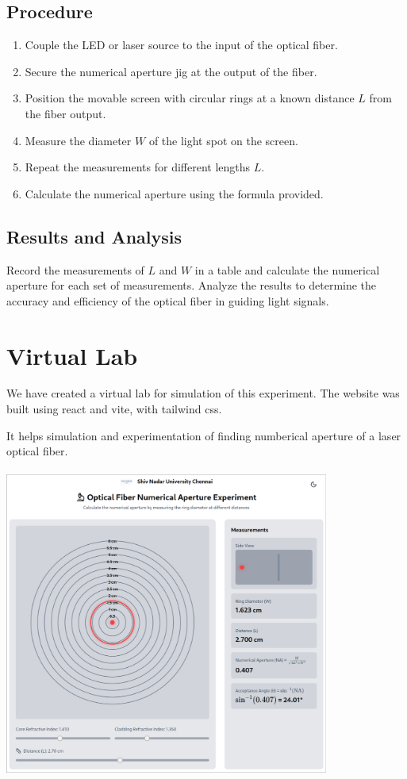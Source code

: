 \documentclass{article}
\theoremstyle{mytheoremstyle}
\theoremstyle{mytheoremstyle}
\theoremstyle{myproblemstyle}
\begin{document}
\subsection{Procedure}

\begin{enumerate}
    \item Couple the LED or laser source to the input of the optical fiber.
    \item Secure the numerical aperture jig at the output of the fiber.
    \item Position the movable screen with circular rings at a known distance \(L\) from the fiber output.
    \item Measure the diameter \(W\) of the light spot on the screen.
    \item Repeat the measurements for different lengths \(L\).
    \item Calculate the numerical aperture using the formula provided.
\end{enumerate}

\subsection{Results and Analysis}

Record the measurements of \(L\) and \(W\) in a table and calculate the numerical aperture for each set of measurements. Analyze the results to determine the accuracy and efficiency of the optical fiber in guiding light signals.

\section{Virtual Lab}

We have created a virtual lab for simulation of this experiment.
The website was built using react and vite, with tailwind css.

It helps simulation and experimentation of finding numberical aperture of a laser optical fiber.
\\\\
\includegraphics[width=0.8\textwidth]{./assets/demo-website.jpg}
\\
\end{document}
